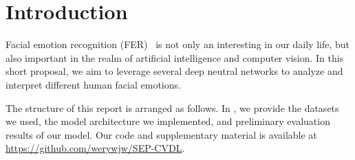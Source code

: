 \section{Introduction}
\label{sec:intro}

Facial emotion recognition (FER)~\cite{Ko18} is not only an interesting in our daily life, 
but also important in the realm of artificial intelligence and computer vision. 
In this short proposal, 
we aim to leverage several deep neutral networks to analyze and interpret different human facial emotions.

The structure of this report is arranged as follows. 
In , 
we provide the datasets we used, 
the model architecture we implemented, 
and preliminary evaluation results of our model. 
Our code and supplementary material is available at \url{https://github.com/werywjw/SEP-CVDL}.

